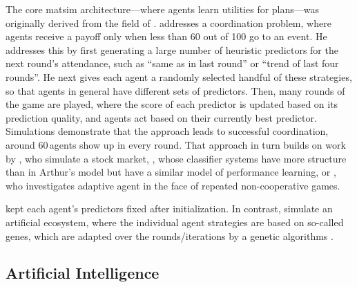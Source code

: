 The core \gls{matsim} architecture---where agents learn utilities for plans---was originally derived from the field of  \citep[e.g.][]{AxelrodBook,Holland_1992,HraberJonesForrestEcho,PalmerEtAl_PhysicaD_1994}. 
%
\citet{ArthurBar} addresses a coordination problem, where agents receive a payoff only when less than 60 out of 100 go to an event.  He addresses this by first generating a large number of heuristic predictors for the next round's attendance, such as ``same as in last round'' or ``trend of last four rounds''.  He next gives each agent a randomly selected handful of these strategies, so that agents in general have different sets of predictors.  Then, many rounds of the game are played, where the score of each predictor is updated based on its prediction quality,  
and agents act based on their currently best predictor.  Simulations demonstrate that the approach leads to successful coordination, \ie around 60\,agents show up in every round.
%
That approach in turn builds on work by \cite{PalmerEtAl_PhysicaD_1994}, who simulate a stock market, \citet{Holland_1992}, whose classifier systems have more structure than in Arthur's model but have a similar model of performance learning, or \cite{AxelrodBook}, who investigates adaptive agent in the face of repeated non-cooperative games.  

\citet{ArthurBar} kept each agent's predictors fixed after initialization.  In contrast,
\citet{HraberJonesForrestEcho} simulate an artificial ecosystem, where the individual agent strategies are based on so-called genes, which are adapted over the rounds/iterations by a genetic algorithms \citep{Goldberg_1989}.

\subsection{Artificial Intelligence}

